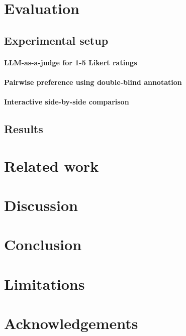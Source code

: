 \documentclass[11pt]{article}
\begin{document}
\section{Evaluation}
\subsection{Experimental setup}

\paragraph{LLM-as-a-judge for 1-5 Likert ratings}

\paragraph{Pairwise preference using double-blind annotation}

\paragraph{Interactive side-by-side comparison}

\subsection{Results}

\section{Related work}
\section{Discussion}
\section{Conclusion}
\section{Limitations}

\section*{Acknowledgements}

%

\clearpage
\appendix
{}
\end{document}
